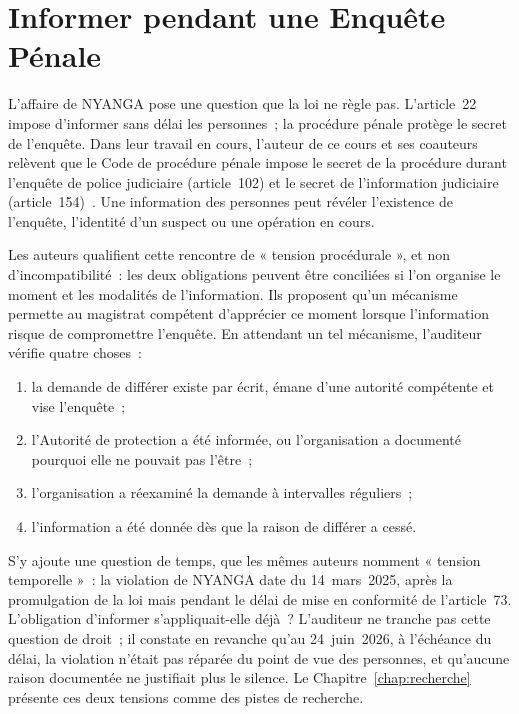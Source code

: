 \section{Informer pendant une Enquête Pénale}
\label{sec:c12-penal}

L'affaire de NYANGA pose une question que la loi ne règle pas. L'article~22
impose d'informer sans délai les personnes~; la procédure pénale protège
le secret de l'enquête. Dans leur travail en cours, l'auteur de ce cours et
ses coauteurs relèvent que le Code de procédure pénale impose le secret de
la procédure durant l'enquête de police judiciaire (article~102) et le
secret de l'information judiciaire (article~154)~\cite{minka2026chainepenale}.
Une information des personnes peut révéler l'existence de l'enquête,
l'identité d'un suspect ou une opération en cours.

Les auteurs qualifient cette rencontre de « tension procédurale », et non
d'incompatibilité~: les deux obligations peuvent être conciliées si l'on
organise le moment et les modalités de l'information. Ils proposent qu'un
mécanisme permette au magistrat compétent d'apprécier ce moment lorsque
l'information risque de compromettre l'enquête. En attendant un tel
mécanisme, l'auditeur vérifie quatre choses~:

\begin{enumerate}
    \item la demande de différer existe par écrit, émane d'une autorité
          compétente et vise l'enquête~;
    \item l'Autorité de protection a été informée, ou l'organisation a
          documenté pourquoi elle ne pouvait pas l'être~;
    \item l'organisation a réexaminé la demande à intervalles réguliers~;
    \item l'information a été donnée dès que la raison de différer a cessé.
\end{enumerate}

S'y ajoute une question de temps, que les mêmes auteurs nomment « tension
temporelle »~: la violation de NYANGA date du 14~mars~2025, après la
promulgation de la loi mais pendant le délai de mise en conformité de
l'article~73. L'obligation d'informer s'appliquait-elle déjà~? L'auditeur
ne tranche pas cette question de droit~; il constate en revanche qu'au
24~juin~2026, à l'échéance du délai, la violation n'était pas réparée du
point de vue des personnes, et qu'aucune raison documentée ne justifiait
plus le silence. Le Chapitre~\ref{chap:recherche} présente ces deux
tensions comme des pistes de recherche.

